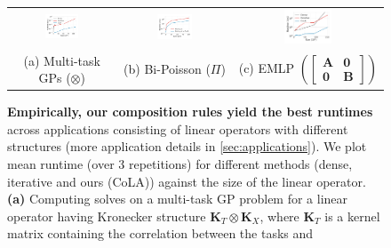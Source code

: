 \documentclass{article}
\newcommand{\mbf}[1]{{\boldsymbol{\mathbf{#1}}}}
\renewcommand{\bm}{\mbf}
\begin{document}
\begin{figure}
    \centering
    \begin{tabular}{ccc}
      \hspace{-2em}
    \includegraphics[width=0.34\textwidth]{./figs/gps_kron_solve.pdf}
      &
      \hspace{-2em}
    \includegraphics[width=0.34\textwidth]{./figs/multigrid_bipoisson.pdf}
      &
      \hspace{-2em}
    \includegraphics[width=0.34\textwidth]{./figs/emlp_block_solve.pdf}
    \vspace{-1em}
    \\
      (a) Multi-task GPs ($\otimes$) & (b) Bi-Poisson ($\Pi$) & (c) EMLP {\tiny $\left(\begin{bmatrix} \bm{A} & \bm{0} \\ \bm{0} & \bm{B} \end{bmatrix}\right)$ }
    \end{tabular}
    \caption{
      \textbf{Empirically, our composition rules yield the best runtimes} across applications consisting of linear operators with different structures (more application details in \autoref{sec:applications}).
      We plot mean runtime (over 3 repetitions) for different methods (dense, iterative and ours (CoLA)) against the size of the linear operator.
      \textbf{(a)} Computing solves on a multi-task GP problem \citep{bonilla2007multitask} for a linear operator having Kronecker structure
      $\bm{K}_{T} \otimes \bm{K}_{X}$, where $\bm{K}_{T}$ is a kernel matrix containing the correlation between the tasks and
}
\end{figure}
\end{document}
